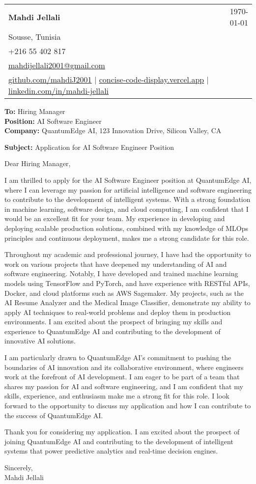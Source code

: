 \documentclass[letterpaper,11pt]{article}
\makeatletter
\newcommand{\letterHeading}[5]{
    \begin{tabular*}{\textwidth}{l@{\extracolsep{\fill}}r}
    \textbf{\Large #1} & #5 \\  %
    #2 & \\
    #3 & \\
    #4 & \\
    \end{tabular*}
    \vspace{15pt}
}
\newcommand{\letterRecipient}[3]{
    \textbf{\large To:} #1 \\
    \textbf{\large Position:} #2 \\
    \textbf{\large Company:} #3 \\
    \vspace{12pt}
}
\newcommand{\letterSubject}[1]{
    \textbf{\large Subject:} #1 \\
    \vspace{15pt}
}
\makeatother
\begin{document}
    \letterHeading
    {Mahdi Jellali}
    {Sousse, Tunisia}
    {+216 55 402 817 \\ \href{mailto:mahdijellali2001@gmail.com}{mahdijellali2001@gmail.com}}
    {\href{https://github.com/mahdiJ2001}{github.com/mahdiJ2001} $|$ \href{https://concise-code-display.vercel.app/}{concise-code-display.vercel.app} $|$ \href{https://www.linkedin.com/in/mahdi-jellali/}{linkedin.com/in/mahdi-jellali}}
    {\today}

    \letterRecipient
    {Hiring Manager}
    {AI Software Engineer}
    {QuantumEdge AI, 123 Innovation Drive, Silicon Valley, CA}

    \letterSubject{Application for AI Software Engineer Position}

    Dear Hiring Manager,

    I am thrilled to apply for the AI Software Engineer position at QuantumEdge AI, where I can leverage my passion for artificial intelligence and software engineering to contribute to the development of intelligent systems. With a strong foundation in machine learning, software design, and cloud computing, I am confident that I would be an excellent fit for your team. My experience in developing and deploying scalable production solutions, combined with my knowledge of MLOps principles and continuous deployment, makes me a strong candidate for this role.

    Throughout my academic and professional journey, I have had the opportunity to work on various projects that have deepened my understanding of AI and software engineering. Notably, I have developed and trained machine learning models using TensorFlow and PyTorch, and have experience with RESTful APIs, Docker, and cloud platforms such as AWS Sagemaker. My projects, such as the AI Resume Analyzer and the Medical Image Classifier, demonstrate my ability to apply AI techniques to real-world problems and deploy them in production environments. I am excited about the prospect of bringing my skills and experience to QuantumEdge AI and contributing to the development of innovative AI solutions.

    I am particularly drawn to QuantumEdge AI's commitment to pushing the boundaries of AI innovation and its collaborative environment, where engineers work at the forefront of AI development. I am eager to be part of a team that shares my passion for AI and software engineering, and I am confident that my skills, experience, and enthusiasm make me a strong fit for this role. I look forward to the opportunity to discuss my application and how I can contribute to the success of QuantumEdge AI.

    Thank you for considering my application. I am excited about the prospect of joining QuantumEdge AI and contributing to the development of intelligent systems that power predictive analytics and real-time decision engines.

    Sincerely,\\[12pt]

    Mahdi Jellali
\end{document}
